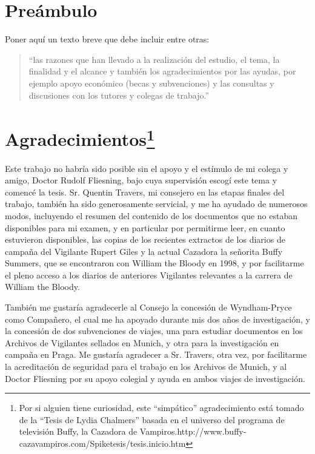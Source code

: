 
\chapter*{Preámbulo}
\thispagestyle{empty}
Poner aquí un texto breve que debe incluir entre otras:
\begin{quote}
``las razones que han llevado a la realización del estudio, el tema, la finalidad y el alcance y también los agradecimientos por las ayudas, por ejemplo apoyo económico (becas y subvenciones) y las consultas y discusiones con los tutores y colegas de trabajo.''
\end{quote}


\cleardoublepage %
\chapter*{Agradecimientos\footnote{Por si alguien tiene curiosidad, este ``simpático'' agradecimiento está tomado de la ``Tesis de Lydia Chalmers'' basada en el universo del programa de televisión Buffy, la Cazadora de Vampiros.http://www.buffy-cazavampiros.com/Spiketesis/tesis.inicio.htm}
}

\thispagestyle{empty}
\vspace{1cm}

Este trabajo no habría sido posible sin el apoyo y el estímulo de mi colega y amigo, Doctor Rudolf Fliesning,  bajo cuya supervisión escogí este tema y comencé la tesis. Sr. Quentin Travers, mi consejero en las etapas finales del trabajo, también ha sido generosamente servicial, y me ha ayudado de numerosos modos, incluyendo el resumen del contenido de los documentos que no estaban disponibles para mi examen, y en particular por permitirme leer, en cuanto estuvieron  disponibles, las copias de los  recientes extractos de los diarios de campaña del Vigilante Rupert Giles y la actual Cazadora la señorita Buffy Summers, que se encontraron con William the Bloody en 1998, y por facilitarme el pleno acceso  a los diarios de anteriores Vigilantes relevantes a la carrera de William the Bloody.

También me gustaría agradecerle al Consejo la concesión de Wyndham-Pryce como Compañero, el cual me ha apoyado durante mis dos años de investigación, y la concesión de dos subvenciones de viajes, una para estudiar documentos en los Archivos de Vigilantes sellados en Munich, y otra para la investigación en campaña en Praga. Me gustaría agradecer a Sr. Travers, otra vez, por facilitarme  la acreditación  de seguridad para el trabajo en los Archivos de Munich, y al Doctor Fliesning por su apoyo colegial y ayuda en ambos viajes de investigación.

